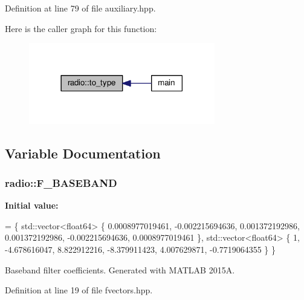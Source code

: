 Definition at line 79 of file auxiliary.\+hpp.



Here is the caller graph for this function\+:
\nopagebreak
\begin{figure}[H]
\begin{center}
\leavevmode
\includegraphics[width=230pt]{namespaceradio_a402fe28e2e2bb2be7a0d2d9f74cc640d_icgraph}
\end{center}
\end{figure}




\subsection{Variable Documentation}
\hypertarget{namespaceradio_a9bd902e9216499953a5906de73dc1796}{
\subsubsection[{F\+\_\+\+B\+A\+S\+E\+B\+A\+N\+D}]{ radio\+::\+F\+\_\+\+B\+A\+S\+E\+B\+A\+N\+D}}\label{namespaceradio_a9bd902e9216499953a5906de73dc1796}
{\bfseries Initial value\+:}
\begin{DoxyCode}
= \{ std::vector<float64> \{
        0.0008977019461,
            -0.002215694636,
            0.001372192986,
            0.001372192986,
            -0.002215694636,
            0.0008977019461 
    \}, std::vector<float64> \{
        1,
            -4.678616047,
            8.822912216,
            -8.379911423,
            4.007629871,
            -0.7719064355
    \} \}
\end{DoxyCode}
Baseband filter coefficients. Generated with M\+A\+T\+L\+A\+B 2015\+A. 

Definition at line 19 of file fvectors.\+hpp.

